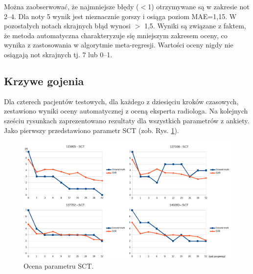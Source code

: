 Można zaobserwować, że najmniejsze błędy ($<$1) otrzymywane są w zakresie not 2--4. Dla noty 5 wynik jest nieznacznie gorszy i osiąga poziom MAE=1,15. \linebreak W pozostałych notach skrajnych błąd wynosi $>$ 1,5. Wyniki są związane z faktem, że metoda automatyczna charakteryzuje się mniejszym zakresem oceny, co wynika z zastosowania w algorytmie meta-regresji. Wartości oceny nigdy nie osiągają not skrajnych tj. 7 lub 0--1. 

\subsection{Krzywe gojenia}
 Dla czterech pacjentów testowych, dla każdego z dziesięciu kroków czasowych, zestawiono wyniki oceny automatycznej z oceną eksperta radiologa. Na kolejnych sześciu rysunkach zaprezentowano rezultaty dla wszystkich parametrów z ankiety. Jako pierwszy przedstawiono parametr SCT (zob. Rys. \ref{fig:SCT}).
\begin{figure}[h!]
	\centering
	\includegraphics[width=1\textwidth]{figures/SCT.png}
	\caption{Ocena parametru SCT.}\label{fig:SCT}
\end{figure}


